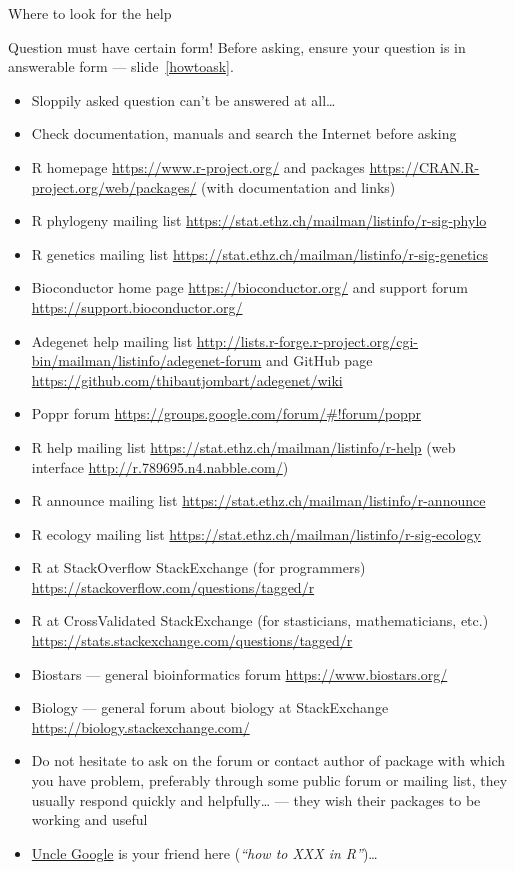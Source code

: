\documentclass[compress, ucs, xelatex, 11pt, xcolor=svgnames,
	hyperref={
		bookmarks=true,
		unicode=true,
		colorlinks=true,
		pdftitle={Molecular data in R},
		plainpages=false,
		pdfauthor={Vojtech Zeisek},
		pdfsubject={Course about phylogeny and evolution in R},
		pdfcreator={XeLaTeX},
		pdfkeywords={R, evolution, phylogeny, molecular data},
		linkcolor=Tomato,
		anchorcolor=SaddleBrown,
		citecolor=Goldenrod,
		filecolor=DarkMagenta,
		menucolor=Sienna,
		urlcolor=DarkTurquoise,
		pdftex},
	url={hyphens, lowtilde} %
	]{beamer}
\begin{document}
\begin{frame}[allowframebreaks]{Where to look for the help}
	\label{help}
	\begin{block}{Question must have certain form!}
			Before asking, \alert{ensure your question is in answerable form} --- slide~\ref{howtoask}.
		\begin{itemize}
			\item Sloppily asked question can't be answered at all\ldots
			\item Check documentation, manuals and search the Internet before asking
		\end{itemize}
	\end{block}
	\begin{itemize}
		\item R homepage \url{https://www.r-project.org/} and packages \url{https://CRAN.R-project.org/web/packages/} (with documentation and links)
		\item R phylogeny mailing list \url{https://stat.ethz.ch/mailman/listinfo/r-sig-phylo}
		\item R genetics mailing list \url{https://stat.ethz.ch/mailman/listinfo/r-sig-genetics}
		\item Bioconductor home page \url{https://bioconductor.org/} and support forum \url{https://support.bioconductor.org/}
		\item Adegenet help mailing list \url{http://lists.r-forge.r-project.org/cgi-bin/mailman/listinfo/adegenet-forum} and GitHub page \url{https://github.com/thibautjombart/adegenet/wiki}
		\item Poppr forum \url{https://groups.google.com/forum/\#!forum/poppr}
		\item R help mailing list \url{https://stat.ethz.ch/mailman/listinfo/r-help} (web interface \url{http://r.789695.n4.nabble.com/})
		\item R announce mailing list \url{https://stat.ethz.ch/mailman/listinfo/r-announce}
		\item R ecology mailing list \url{https://stat.ethz.ch/mailman/listinfo/r-sig-ecology}
		\item R at StackOverflow StackExchange (for programmers) \url{https://stackoverflow.com/questions/tagged/r}
		\item R at CrossValidated StackExchange (for stasticians, mathematicians, etc.) \url{https://stats.stackexchange.com/questions/tagged/r}
		\item Biostars --- general bioinformatics forum \url{https://www.biostars.org/}
		\item Biology --- general forum about biology at StackExchange \url{https://biology.stackexchange.com/}
		\item Do not hesitate to ask on the forum or contact author of package with which you have problem, preferably through some public forum or mailing list, they usually respond quickly and helpfully\ldots{ }--- they wish their packages to be working and useful
		\item \href{http://rseek.org/}{Uncle Google} is your friend here (\textit{``how to XXX in R''})\ldots
	\end{itemize}
\end{frame}
\end{document}
